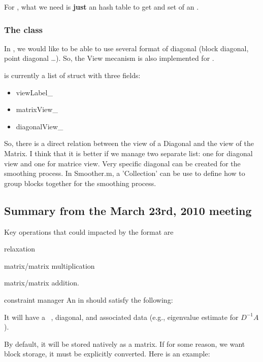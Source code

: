 For \ViewTable, what we need is \textbf{just} an hash table to get and set \View of an \Operator.
  
\subsubsection{The \Diagonal class}

In \mloo, we would like to be able to use several format of diagonal (block diagonal, point diagonal \dots). So, the View mecanism is also implemented for \Diagonal.

\begin{remark}
\ViewTable is currently a list of struct with three fields:
\begin{itemize}
\item viewLabel\_
\item matrixView\_
\item diagonalView\_
\end{itemize}
So, there is a direct relation between the view of a Diagonal and the view of the Matrix.
I think that it is better if we manage two separate list: one for diagonal view and one for matrice view.
Very specific diagonal can be created for the smoothing process. In Smoother.m, a 'Collection' can be use to define how to group blocks together for the smoothing process.
\end{remark}


\MeetingSummary
\subsection{Summary from the March 23rd, 2010 meeting}

Key operations that could impacted by the \operator format are
\be
    \item relaxation
    \item matrix/matrix multiplication
    \item matrix/matrix addition.
    \item constraint manager
\ee
%
An \operator in \mloo should satisfy the following:
%
\be
  \item It will have a \point\ \getrow, \point diagonal, and associated data (e.g., eigenvalue estimate for $D^{-1}A$).

  \item By default, it will be stored natively as a \point matrix.  If for some reason, we want block storage, it must
  be explicitly converted.  Here is an example:

